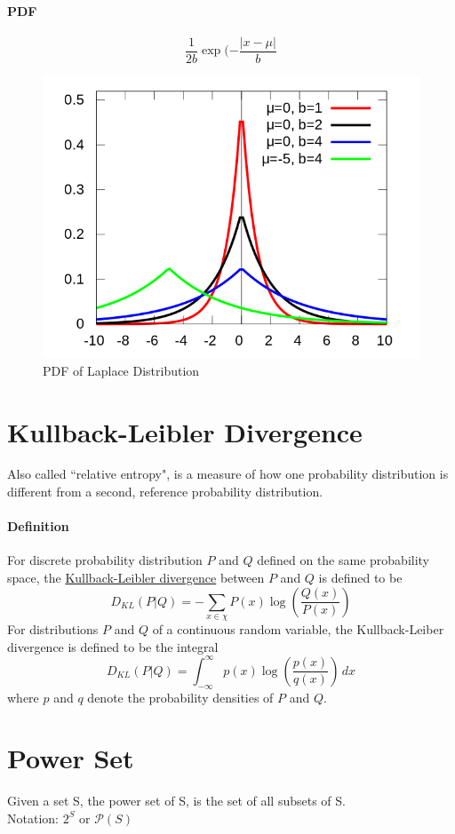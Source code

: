 \documentclass[11pt]{article}
\newcommand{\under}[1]{\underline{#1}}
\begin{document}
\paragraph{PDF}
$$\frac{1}{2b}\exp(-\frac{|x-\mu|}{b}$$
\begin{figure}[h]
	\centering
	\includegraphics[scale=0.3]{laplace.png}
	\caption{PDF of Laplace Distribution}
\end{figure}

\section{Kullback-Leibler Divergence}
Also called ``relative entropy", is a measure of how one probability distribution is different from a second, reference probability distribution.
\paragraph{Definition}
For discrete probability distribution $P$ and $Q$ defined on the same probability space, the \under{Kullback-Leibler divergence} between $P$ and $Q$ is defined to be
$$D_{KL}(P|Q) = - \sum_{x \in \chi} P(x)\log(\frac{Q(x)}{P(x)})$$
For distributions $P$ and $Q$ of a continuous random variable, the Kullback-Leiber divergence is defined to be the integral
$$D_{KL}(P|Q) = \int_{-\infty}^\infty p(x)\log(\frac{p(x)}{q(x)})\, dx$$ where $p$ and $q$ denote the probability densities of $P$ and $Q$.

\section{Power Set}
Given a set S, the power set of S, is the set of all subsets of S. \\
Notation: $2^S$ or $\mathcal{P}(S)$
 
\end{document}
